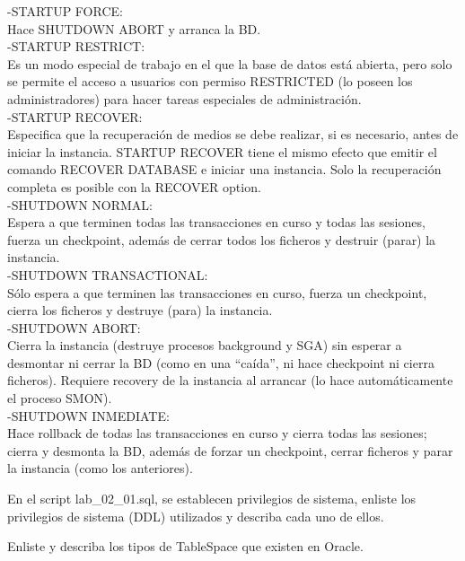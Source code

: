     -STARTUP FORCE:\\
    Hace SHUTDOWN ABORT y arranca la BD.\\
    
    -STARTUP RESTRICT:\\
    Es un modo especial de trabajo en el que la base de datos está abierta, pero solo se permite el acceso a usuarios 
    con permiso RESTRICTED (lo poseen los administradores) para hacer tareas especiales de administración.\\
    
    -STARTUP RECOVER:\\
    Especifica que la recuperación de medios se debe realizar, si es necesario, antes de iniciar la instancia. STARTUP RECOVER tiene el mismo efecto que emitir el comando RECOVER DATABASE e iniciar una instancia. Solo la recuperación completa es posible con la RECOVER option.\\
    
    -SHUTDOWN NORMAL:\\
    Espera a que terminen todas las transacciones en curso y todas las sesiones, 
    fuerza un checkpoint, además de cerrar todos los ficheros y destruir (parar) la instancia.\\
    
    -SHUTDOWN TRANSACTIONAL:\\
    Sólo espera a que terminen las transacciones en curso, fuerza un checkpoint, cierra los ficheros y destruye (para) la instancia.\\
    
    -SHUTDOWN ABORT:\\
     Cierra la instancia (destruye procesos background y SGA) sin esperar a desmontar ni cerrar la BD (como en una “caída”, ni hace checkpoint ni cierra ficheros). Requiere recovery de la instancia al arrancar (lo hace automáticamente el proceso SMON).\\

    -SHUTDOWN INMEDIATE:\\
    Hace rollback de todas las transacciones en curso y cierra todas las sesiones; cierra y desmonta la BD, además de forzar un checkpoint, cerrar ficheros y parar la instancia (como los anteriores).\\
    
   \item En el script lab_02_01.sql, se establecen privilegios de sistema, enliste los privilegios de sistema (DDL) 
   utilizados y describa cada uno de ellos.\\
   
   \item Enliste y describa los tipos de TableSpace que existen en Oracle.\\
   
